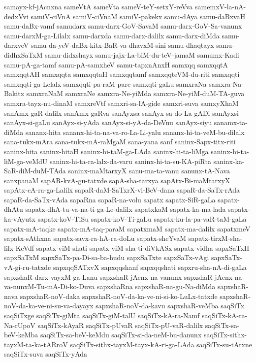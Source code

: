 {samayx-kf-jAcnxna
sameVtA
sameVta
sameV-teY-setxY-reVva
samemxV-la-nA-dedxVvi
samiV-ciVnA
samiV-ciVnaM
samiV-pakekx
samu-dAya
samu-daBxvaH
samu-daBx-vamf
samudarx
samu-darx-GoV-SavaM
samu-darx-GoV-Sa-vanunx
samu-darxM-ga-Lilalx
samu-darxda
samu-darx-dalilx
samu-darx-diMda
samu-darxveV
samu-da-yeV-daBx-kitx-BaR-va-dhavxM-sini
samu-dhaqtayx
samu-didhxSaTxM
samu-didxshayx
samu-jajx-La-biM-du-teV-jamaM
samumx-Kadi
samu-pA-ga-tamf
samu-pA-samxheV
samu-tapxnAnxH
samxqq
samxqqtA
samxqqtAH
samxqqta
samxqqtaH
samxqqtamf
samxqqteVM-du-riti
samxqqti
samxqqti-ga-Lelalx
samxqqti-pa-raM-pare
samxqti-gaLu
samxraNa
samxra-Na-Bakitx
samxraNaM
samxraNe
samxra-Ne-yiMda
samxra-Ne-yiM-duM-TA-guva
samxra-tayx-nu-dinaM
samxreVtf
samxri-sa-lA-gide
samxri-suva
samxyXhaM
sanAmx-gaR-dalilx
sanAmx-gaRva
sanAyxsa
sanAyx-sa-do-La-gADi
sanAyxsi
sanAyx-si-gaLu
sanAyx-si-yAda
sanAyx-si-yA-da-DeVnu
sanAyx-siyu
sanamx-ta-diMda
sananx-hita
sananx-hi-ta-na-va-ro-La-Li-yalu
sananx-hi-ta-veM-bu-dilalx
sana-tukx-mAra
sana-tukx-mA-raMgaM
sana-yana
sanf
saninx-Sapx-titx-riti
saninx-hita
saninx-hitaH
saninx-hi-taM-ga-LAda
saninx-hi-ta-liMga
saninx-hi-ta-liM-ga-veMdU
saninx-hi-ta-ra-lalx-da-varu
saninx-hi-ta-su-KA-piRta
saninx-ka-SaR-diM-duM-TAda
saninx-maMtarxyX
sanu-ma-ta-vanu
sanunx-tA-Nava
sanxpanaM
sapAR-kvA-gu-tatxde
sapA-sha-tarxya
sapAtx-Bi-maMtarxyX
sapAtx-cA-ra-ga-Lalilx
sapaR-daM-SaTxrX-vi-BeV-dana
sapaR-da-SaTx-rAda
sapaR-da-SaTx-vAda
sapaRna
sapaR-na-volu
sapatx
sapatx-SiR-gaLa
sapatx-dhAtu
sapatx-dhA-tu-va-na-ti-ga-Le-dalilx
sapatxkaM
sapatx-ka-ma-lada
sapatx-ka-vAyutx
sapatx-koV-TiSu
sapatx-koV-Ti-gaLu
sapatx-ku-la-pa-vaR-taM-gaLa
sapatx-mA-taqke
sapatx-mA-taq-paraM
sapatxmaM
sapatx-ma-dalilx
sapatxmeV
sapatx-sAthxna
sapatx-savx-ra-hA-ra-doLu
sapatx-sheYvaM
sapatx-tirxM-sha-lilx-KeVdf
sapatx-viM-shati
sapatx-viM-sha-ti-diVkASx
sapatx-vidha
sapxSaTxH
sapxSaTxM
sapxSaTx-pa-Di-sa-ba-hudu
sapxSaTxte
sapxSaTx-vAgi
sapxSaTx-vA-gi-ru-tatxde
sapxqqSATxvX
sapxqqshanf
sapxqqshati
sapxru-sha-nA-di-gaLa
sapxshaR-darx-vayxM-ga-Lanu
sapxshaR-jAcnx-na-vanunx
sapxshaR-jAcnx-na-va-nunxM-Tu-mA-Di-ko-Duva
sapxshaRna
sapxshaR-na-gu-Na-diMda
sapxshaR-nava
sapxshaR-noV-daka
sapxshaR-noV-da-ka-ve-ni-si-ko-LuLx-tatxde
sapxshaR-noV-da-ka-ve-ni-su-va-dayayx
sapxshaR-noV-da-kavu
sapxshaR-veMba
saqSiTx
saqSiTxge
saqSiTx-giMta
saqSiTx-giM-talU
saqSiTx-kA-ra-Namf
saqSiTx-kA-ra-Na-rUpoV
saqSiTx-kAyaR
saqSiTx-pUvaR
saqSiTx-pU-vaR-dalilx
saqSiTx-sa-beV-keMba
saqSiTx-sa-beV-keMdu
saqSiTx-si-da-neM-bu-danunx
saqSiTx-sithx-tayxM-ta-ka-tARroV
saqSiTx-sithx-tayxM-tayx-kA-ri-ga-LAda
saqSiTx-su-tAtxne
saqSiTx-suva
saqSiTx-yAda
}
